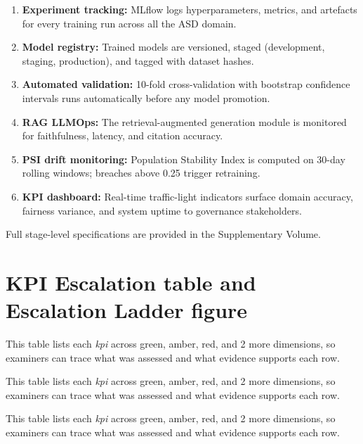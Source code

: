 \begin{enumerate}[leftmargin=*, itemsep=3pt]
    \item \textbf{Experiment tracking:} MLflow logs hyperparameters, metrics, and artefacts for every training run across all the ASD domain.
    \item \textbf{Model registry:} Trained models are versioned, staged (development, staging, production), and tagged with dataset hashes.
    \item \textbf{Automated validation:} 10-fold cross-validation with bootstrap confidence intervals runs automatically before any model promotion.
    \item \textbf{RAG LLMOps:} The retrieval-augmented generation module is monitored for faithfulness, latency, and citation accuracy.
    \item \textbf{PSI drift monitoring:} Population Stability Index is computed on 30-day rolling windows; breaches above 0.25 trigger retraining.
    \item \textbf{KPI dashboard:} Real-time traffic-light indicators surface domain accuracy, fairness variance, and system uptime to governance stakeholders.
\end{enumerate}

\noindent Full stage-level specifications are provided in the Supplementary Volume.
\fi

\section{KPI Escalation table and Escalation Ladder figure}
\label{sec:appendix_ch5_s7}


\noindent This table lists each \textit{kpi} across green, amber, red, and 2 more dimensions, so examiners can trace what was assessed and what evidence supports each row.



\noindent This table lists each \textit{kpi} across green, amber, red, and 2 more dimensions, so examiners can trace what was assessed and what evidence supports each row.


\noindent This table lists each \textit{kpi} across green, amber, red, and 2 more dimensions, so examiners can trace what was assessed and what evidence supports each row.



